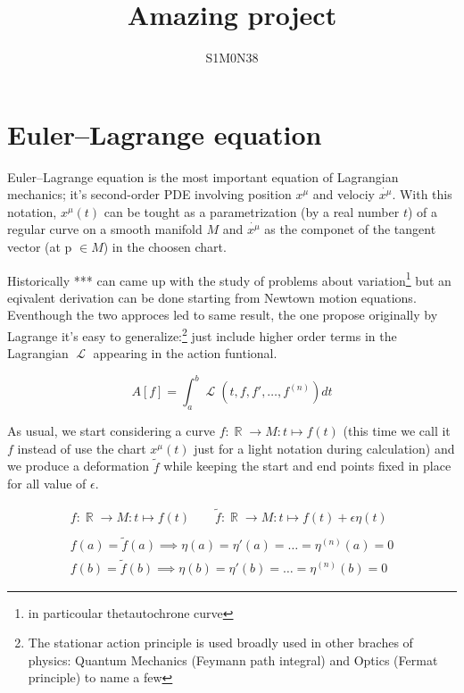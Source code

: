 \documentclass[a4paper]{article}
\title{Amazing project}
\author{S1M0N38}
\DeclareMathOperator{\Lagr}{\mathcal{L}} %
\DeclareMathOperator{\R}{\mathbb{R}} %
\begin{document}
  \maketitle
  \newpage

  \begin{abstract}
    \lipsum[1]
  \end{abstract}


  \section{Euler–Lagrange equation}

  Euler–Lagrange equation is the most important equation of Lagrangian
  mechanics; it's second-order PDE involving position $x^{\mu}$ and velociy
  $\dot{x^{\mu}}$. With this notation, $x^{\mu}(t)$ can be tought as a
  parametrization (by a real number $t$) of a regular curve on a smooth
  manifold $M$ and $\dot{x^{\mu}}$ as the componet of the tangent vector (at
  p $\in M$) in the choosen chart.

  Historically *** can came up with the study of problems about
  variation\footnote{in particoular thetautochrone curve} but an eqivalent
  derivation can be done starting from Newtown motion equations.
  Eventhough the two approces led to same result, the one
  propose originally by Lagrange it's easy to generalize:\footnote{The
  stationar action principle is used broadly used in other braches of physics:
  Quantum Mechanics (Feymann path integral) and Optics (Fermat principle) to
  name a few} just include higher order terms in the Lagrangian $\Lagr$
  appearing in the action funtional.

  \begin{equation*}
    A[f] = \int_{a}^{b} \Lagr(t, f, f', \ldots, f^{(n)}) dt
  \end{equation*}

  As usual, we start considering a curve $f: \R \rightarrow M: t \mapsto f(t)$
  (this time we call it $f$ instead of use the chart $x^{\mu}(t)$ just for
  a light notation during calculation) and we produce a deformation $\tilde{f}$
  while keeping the start and end points fixed in place for all value of
  $\epsilon$.

  \begin{gather*}
    f:  \R \rightarrow M: t \mapsto f(t) \qquad
    \tilde{f} : \R \rightarrow M: t \mapsto f(t) + \epsilon\eta(t) \\
    \\
    f(a) = \tilde{f}(a) \implies \eta(a) = \eta'(a) = \ldots = \eta^{(n)}(a) = 0 \\
    f(b) = \tilde{f}(b) \implies \eta(b) = \eta'(b) = \ldots = \eta^{(n)}(b) = 0
  \end{gather*}
\end{document}
